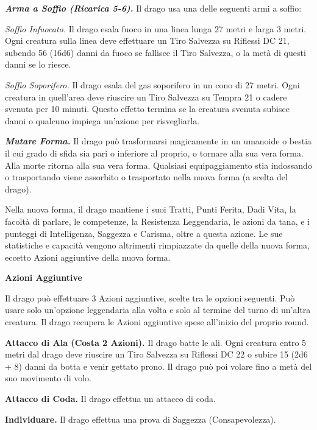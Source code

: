 \begin{multicols}{2}
\textit{\textbf{Arma a Soffio (Ricarica 5-6).}} Il drago usa una delle seguenti armi a soffio:

\textit{Soffio Infuocato.} Il drago esala fuoco in una linea lunga 27 metri e larga 3 metri. Ogni creatura sulla linea deve effettuare un Tiro Salvezza su Riflessi DC 21, subendo 56 (16d6) danni da fuoco se fallisce il Tiro Salvezza, o la metà di questi danni se lo riesce.

\textit{Soffio Soporifero.} Il drago esala del gas soporifero in un cono di 27 metri. Ogni creatura in quell'area deve riuscire un Tiro Salvezza su Tempra 21 o cadere svenuta per 10 minuti. Questo effetto
termina se la creatura svenuta subisce danni o qualcuno impiega un'azione per risvegliarla.

\textit{\textbf{Mutare Forma.}} Il drago può trasformarsi magicamente in un umanoide o bestia il cui grado di sfida sia pari o inferiore al proprio, o tornare alla sua vera forma. Alla morte ritorna alla sua vera forma. Qualsiasi equipaggiamento stia indossando o trasportando viene assorbito o trasportato nella nuova forma (a scelta del drago).

Nella nuova forma, il drago mantiene i suoi Tratti, Punti Ferita, Dadi Vita, la facoltà di parlare, le competenze, la Resistenza Leggendaria, le azioni da tana, e i punteggi di Intelligenza, Saggezza e Carisma, oltre a questa azione. Le sue statistiche e capacità vengono altrimenti rimpiazzate da quelle della nuova forma, eccetto Azioni aggiuntive della nuova forma.

\textbf{Azioni Aggiuntive}

Il drago può effettuare 3 Azioni aggiuntive, scelte tra le opzioni seguenti. Può usare solo un'opzione leggendaria alla volta e solo al termine del turno di un'altra creatura. Il drago recupera le Azioni aggiuntive spese all'inizio del proprio round.

\textbf{Attacco di Ala (Costa 2 Azioni).} Il drago batte le ali. Ogni creatura entro 5 metri dal drago deve riuscire un Tiro Salvezza su Riflessi DC 22 o subire 15 (2d6 + 8) danni da botta e venir gettato prono. Il drago può poi volare fino a metà del suo movimento di volo.

\textbf{Attacco di Coda.} Il drago effettua un attacco di coda.

\textbf{Individuare.} Il drago effettua una prova di Saggezza (Consapevolezza).


\end{multicols}
